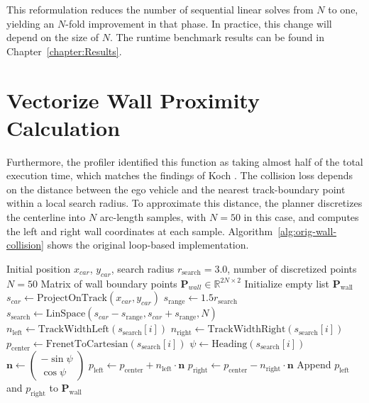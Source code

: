 This reformulation reduces the number of sequential linear solves from $N$ to one, yielding an $N$-fold improvement in that phase.
In practice, this change will depend on the size of $N$.
The runtime benchmark results can be found in Chapter~\ref{chapter:Results}.

\section{Vectorize Wall Proximity Calculation}
\label{section:VecWallCollision}

Furthermore, the profiler identified this function as taking almost half of the total execution time, which matches the findings of Koch \cite{koch_DifferentiableInterpretablePath_2025}.
The collision loss depends on the distance between the ego vehicle and the nearest track-boundary point within a local search radius.
To approximate this distance, the planner discretizes the centerline into $N$ arc-length samples, with $N = 50$ in this case, and computes the left and right wall coordinates at each sample.
Algorithm~\ref{alg:orig-wall-collision} shows the original loop-based implementation.

\begin{algorithm}[htbp]
\caption{Original Wall Collision}
\label{alg:orig-wall-collision}
\begin{algorithmic}[1]
\Require Initial position $x_{car}$, $y_{car}$, search radius $r_{\text{search}} = 3.0$, number of discretized points $N = 50$
\Ensure Matrix of wall boundary points $\mathbf{P}_{wall} \in \mathbb{R}^{2N \times 2}$
\State Initialize empty list $\mathbf{P}_{\text{wall}}$
\State $s_{car} \gets \text{ProjectOnTrack}(x_{car}, y_{car})$ 
\State $s_{\text{range}} \gets  1.5r_{\text{search}}$
\State $s_{\text{search}} \gets \text{LinSpace}(s_{car} - s_{\text{range}}, s_{car} + s_{\text{range}}, N)$ 
    \State $n_{\text{left}} \gets \text{TrackWidthLeft}(s_{\text{search}}[i])$
    \State $n_{\text{right}} \gets \text{TrackWidthRight}(s_{\text{search}}[i])$ 
    \State $p_{\text{center}} \gets \text{FrenetToCartesian}(s_{\text{search}}[i])$ 
    \State $\psi \gets \text{Heading}(s_{\text{search}}[i])$ 
    \State $\mathbf{n} \gets \begin{pmatrix} -\sin\psi \\ \cos\psi \end{pmatrix}$ 
    \State $p_{\text{left}} \gets  p_{\text{center}} + n_{\text{left}} \cdot \mathbf{n}$
    \State $p_{\text{right}} \gets  p_{\text{center}} - n_{\text{right}} \cdot \mathbf{n}$
    \State Append $p_{\text{left}}$ and $ p_{\text{right}}$ to $\mathbf{P}_{\text{wall}}$
\EndFor
\end{algorithmic}
\end{algorithm}

